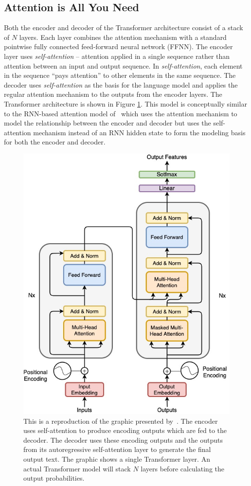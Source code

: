 \subsection{Attention is All You Need}
Both the encoder and decoder of the Transformer architecture consist of a stack of $N$ layers. Each layer combines the attention mechanism with a standard pointwise fully connected feed-forward neural network (FFNN). The encoder layer uses \emph{self-attention} -- attention applied in a single sequence rather than attention between an input and output sequence. In \emph{self-attention}, each element in the sequence ``pays attention'' to other elements in the same sequence. The decoder uses \emph{self-attention} as the basis for the language model and applies the regular attention mechanism to the outputs from the encoder layers. The Transformer architecture is shown in Figure \ref{fig:transformer_architecture}. This model is conceptually similar to the RNN-based attention model of~\citet{bahdanau2014neural} which uses the attention mechanism to model the relationship between the encoder and decoder but uses the self-attention mechanism instead of an RNN hidden state to form the modeling basis for both the encoder and decoder. 

\begin{figure}[hb]
    \centering
    \includegraphics[width=0.6\linewidth]{figs/ch3/transformer_architecture.jpg}
    \caption{This is a reproduction of the graphic presented by~\cite{vaswani2017attention}. The encoder uses self-attention to produce encoding outputs which are fed to the decoder. The decoder uses these encoding outputs and the outputs from its autoregressive self-attention layer to generate the final output text. The graphic shows a single Transformer layer. An actual Transformer model will stack $N$ layers before calculating the output probabilities. }
    \label{fig:transformer_architecture}
\end{figure}

